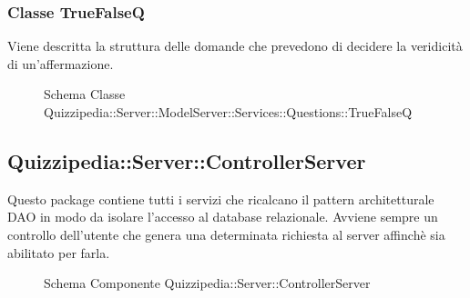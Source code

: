 \subsubsection{Classe TrueFalseQ}
Viene descritta la struttura delle domande che prevedono di decidere la veridicità di un'affermazione.
\begin{figure}[H]
\centering
\noindent{}
\caption[Schema Classe TrueFalseQ]{Schema Classe Quizzipedia::Server::ModelServer::Services::Questions::TrueFalseQ}
\end{figure}
\subsection{Quizzipedia::Server::ControllerServer}
Questo package contiene tutti i servizi che ricalcano il pattern architetturale DAO in modo da isolare l'accesso al database relazionale. Avviene sempre un controllo dell'utente che genera una determinata richiesta al server affinchè sia abilitato per farla.
\begin{figure}[H]
\centering
\noindent{}
\caption[Schema Componente Quizzipedia::Server::ControllerServer]{Schema Componente Quizzipedia::Server::ControllerServer}
\end{figure}
